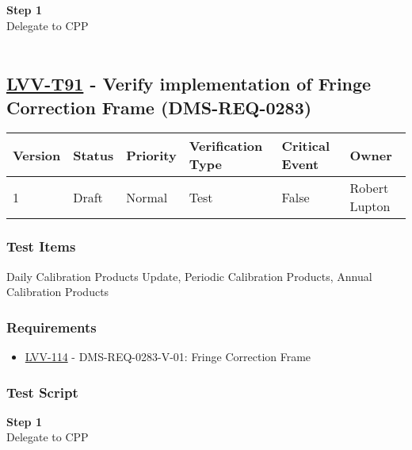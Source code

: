\textbf{Step 1}\\
Delegate to CPP\\
~\\

\hypertarget{lvv-t91---verify-implementation-of-fringe-correction-frame-dms-req-0283}{%
\subsection{\texorpdfstring{\href{https://jira.lsstcorp.org/secure/Tests.jspa\#/testCase/LVV-T91}{LVV-T91}
- Verify implementation of Fringe Correction Frame
(DMS-REQ-0283)}{LVV-T91 - Verify implementation of Fringe Correction Frame (DMS-REQ-0283)}}\label{lvv-t91---verify-implementation-of-fringe-correction-frame-dms-req-0283}}

\begin{longtable}[]{@{}llllll@{}}
\toprule
Version & Status & Priority & Verification Type & Critical Event &
Owner\tabularnewline
\midrule
\endhead
1 & Draft & Normal & Test & False & Robert Lupton\tabularnewline
\bottomrule
\end{longtable}

\hypertarget{test-items-67}{%
\subsubsection{Test Items}\label{test-items-67}}

Daily Calibration Products Update, Periodic Calibration Products, Annual
Calibration Products~

\hypertarget{requirements-68}{%
\subsubsection{Requirements}\label{requirements-68}}

\begin{itemize}
\tightlist
\item
  \href{https://jira.lsstcorp.org/browse/LVV-114}{LVV-114} -
  DMS-REQ-0283-V-01: Fringe Correction Frame
\end{itemize}

\hypertarget{test-script-68}{%
\subsubsection{Test Script}\label{test-script-68}}

\textbf{Step 1}\\
Delegate to CPP\\
~\\

